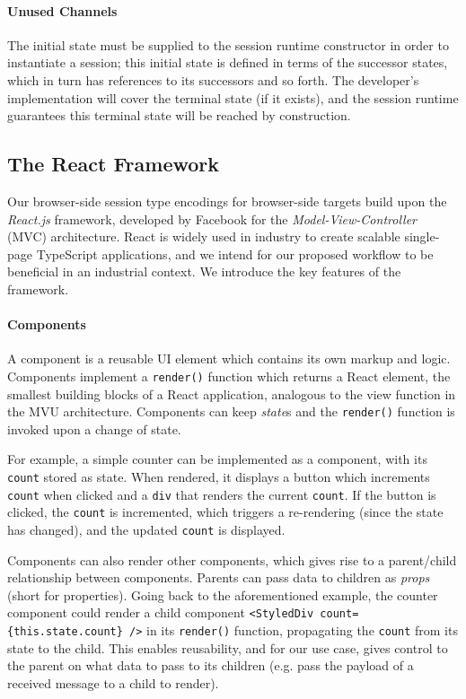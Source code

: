 \paragraph{Unused Channels}
The initial state must be supplied to the session runtime
constructor in order to instantiate a session;
this initial state is defined
in terms of the successor states, which in turn has references to its
successors and so forth.
The developer's implementation will cover the terminal state
(if it exists), and the
session runtime guarantees this terminal state will be reached
by construction.

\subsection{The React Framework}
Our browser-side session type encodings for browser-side targets build upon the
\emph{React.js} framework, developed by Facebook \cite{React} for the
\textit{Model-View-Controller} (MVC) architecture.
React is widely used in industry to create scalable single-page TypeScript
applications, and we intend for our proposed workflow to be beneficial in an
industrial context.
We introduce the key features of the framework.

\paragraph{Components}
A component is a reusable UI element which
contains its own markup and logic.
Components implement a \texttt{render()} function which returns a React
element, the smallest building blocks of a React application, analogous to the
view function in the MVU architecture.
Components can keep \textit{state}s and the \texttt{render()} function is
invoked upon a change of state.

For example, a simple counter can be implemented as a component,
with its \texttt{count} stored as state.
When rendered, it displays a button which increments \texttt{count}
when clicked and a \texttt{div} that renders the current
\texttt{count}.
If the button is clicked, the \texttt{count} is incremented, which triggers a
re-rendering (since the state has changed), and the updated \texttt{count} is
displayed.

Components can also render other components, which gives rise
to a parent/child relationship between components.
Parents can pass data to children as \textit{props} (short for properties).
Going back to the aforementioned example, the counter component could
render a child component \texttt{<StyledDiv count=\{this.state.count\} />} in
its \texttt{render()} function, propagating the \texttt{count} from its state
to the child.
This enables reusability, and for our use case, gives control to the parent
on what data to pass to its children (e.g. pass the payload of a received
message to a child to render).

